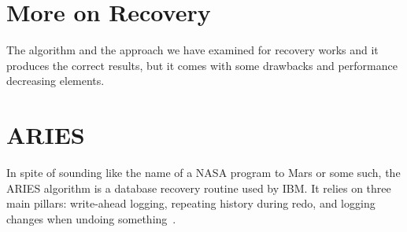 




\section*{More on Recovery}
The algorithm and the approach we have examined for recovery works and it produces the correct results, but it comes with some drawbacks and performance decreasing elements. 


\section*{ARIES}
In spite of sounding like the name of a NASA program to Mars or some such, the ARIES algorithm is a database recovery routine used by IBM. It relies on three main pillars: write-ahead logging, repeating history during redo, and logging changes when undoing something~\cite{fds}.




